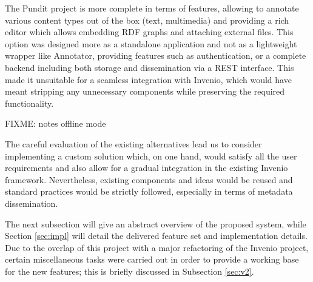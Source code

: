 The Pundit project is more complete in terms of features, allowing to annotate
various content types out of the box (text, multimedia) and providing a rich
editor which allows embedding RDF graphs and attaching external files. This
option was designed more as a standalone application and not as a lightweight
wrapper like Annotator, providing features such as authentication, or a
complete backend including both storage and dissemination via a REST interface.
This made it unsuitable for a seamless integration with Invenio, which would
have meant stripping any unnecessary components while preserving the required
functionality.

FIXME: notes offline mode

The careful evaluation of the existing alternatives lead us to consider
implementing a custom solution which, on one hand, would satisfy all the user
requirements and also allow for a gradual integration in the existing Invenio
framework. Nevertheless, existing components and ideas would be reused and
standard practices would be strictly followed, especially in terms of metadata
dissemination.

The next subsection will give an abstract overview of the proposed system,
while Section \ref{sec:impl} will detail the delivered feature set and
implementation details. Due to the overlap of this project with a major
refactoring of the Invenio project, certain miscellaneous tasks were carried
out in order to provide a working base for the new features; this is briefly
discussed in Subsection \ref{sec:v2}.
